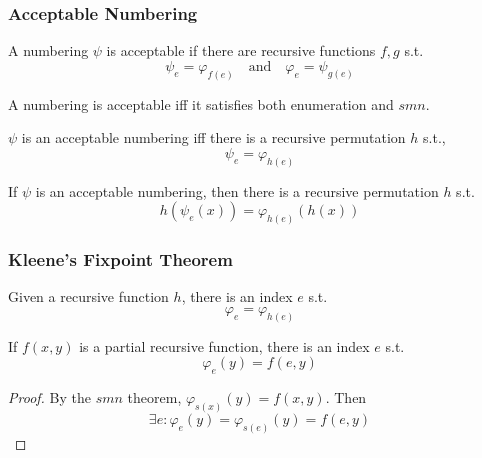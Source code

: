 \documentclass[UTF8,11pt,colorlinks,compress,openany]{beamer}%
\begin{document}
\begin{frame}\frametitle{Acceptable Numbering}
	\begin{definition}
		A numbering $\psi$ is acceptable if there are recursive functions $f,g$ s.t.
	\setlength\abovedisplayskip{0pt}
	\setlength\belowdisplayskip{0pt}
		\[\psi_e=\varphi_{f(e)}\quad\text{and}\quad\varphi_e=\psi_{g(e)}\]
	\end{definition}
	\begin{theorem}
		A numbering is acceptable iff it satisfies both enumeration and $smn$.
	\end{theorem}	
	\begin{theorem}
		$\psi$ is an acceptable numbering iff there is a recursive permutation $h$ s.t.,
	\setlength\abovedisplayskip{0pt}
	\setlength\belowdisplayskip{0pt}
		\[\psi_e=\varphi_{h(e)}\]
	\end{theorem}
	\begin{theorem}[Blum]
		If $\psi$ is an acceptable numbering, then there is a recursive permutation $h$ s.t.
	\setlength\abovedisplayskip{0pt}
	\setlength\belowdisplayskip{0pt}
		\[h(\psi_e(x))=\varphi_{h(e)}(h(x))\]
	\end{theorem}
\end{frame}

\begin{frame}\frametitle{Kleene's Fixpoint Theorem}
\setlength\abovedisplayskip{0pt}
\setlength\belowdisplayskip{0pt}
	\begin{theorem}
		Given a recursive function $h$, there is an index $e$ s.t.
		\[\varphi_e=\varphi_{h(e)}\]
	\end{theorem}
	\begin{corollary}
		If $f(x,y)$ is a partial recursive function, there is an index $e$ s.t.
		\[\varphi_e(y)=f(e,y)\]
	\end{corollary}
	\begin{proof}
		By the $smn$ theorem, $\varphi_{s(x)}(y)=f(x,y)$. Then
		\[\exists e:\varphi_e(y)=\varphi_{s(e)}(y)=f(e,y)\]
	\end{proof}
\end{frame}
\end{document}
